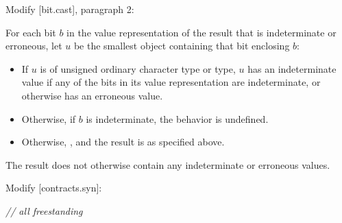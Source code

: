 Modify [bit.cast], paragraph 2:

\begin{adjustwidth}{0.5cm}{0.5cm}
For each bit $b$ in the value representation of the result that is indeterminate or erroneous, let $u$ be the smallest object containing that bit enclosing $b$:
\begin{itemize}
\item  If $u$ is of unsigned ordinary character type or  type, $u$ has an indeterminate value if any of the bits in its value representation are indeterminate, or otherwise has an erroneous value.
\item Otherwise, if $b$ is indeterminate, the behavior is undefined.
\item Otherwise, , and the result is as specified above.
\end{itemize}
The result does not otherwise contain any indeterminate or erroneous values.
\end{adjustwidth}

Modify [contracts.syn]:

\begin{adjustwidth}{0.5cm}{0.5cm}
\emph{// all freestanding} \\
 \\
\\
\codetab {} \\
\codetab \codetab {} \\
\codetab \codetab {} \\
\codetab \codetab {} \\
\codetab \codetab {} \\
\codetab \tcode{\};} \\
\\
\codetab \tcode{[...]} \\ 
\\
\codetab {} \\
\codetab \codetab {} \\
\codetab \codetab {} \\
\codetab \codetab {} \\
\codetab \tcode{\};} 
\end{adjustwidth}

